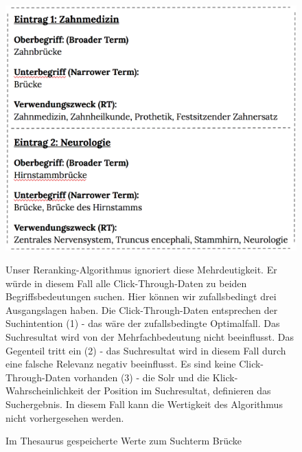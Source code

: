 \begin{figure}[H]
\centering
\begin{minipage}{0.45\linewidth}
        \centering
        \vspace{-2em}
		\caption[Im Thesaurus gespeicherte Werte zum Suchterm \glqq Brücke\grqq{}]{Im Thesaurus gespeicherte Werte zum Suchterm \glqq Brücke\grqq{}}
		\label{fig:ThesaurusBruecke}
		\includegraphics[width=\linewidth]{gfx/BeispielMehrdeutigkeit}
		\vspace{-3em}
    \end{minipage}
    \hfill
    \begin{minipage}{0.45\linewidth}
        Unser Reranking-Algorithmus ignoriert diese Mehrdeutigkeit. Er würde in diesem Fall alle Click-Through-Daten zu beiden Begriffsbedeutungen suchen. Hier können wir zufallsbedingt drei Ausgangslagen haben. Die Click-Through-Daten entsprechen der Suchintention (1) - das wäre der zufallsbedingte Optimalfall. Das Suchresultat wird von der Mehrfachbedeutung nicht beeinflusst. Das Gegenteil tritt ein (2) - das Suchresultat wird in diesem Fall durch eine falsche Relevanz negativ beeinflusst. Es sind keine Click-Through-Daten vorhanden (3) - die Solr und die Klick-Wahrscheinlichkeit der Position im Suchresultat, definieren das Suchergebnis. In diesem Fall kann die Wertigkeit des Algorithmus nicht vorhergesehen werden.
    \end{minipage}
\end{figure}

